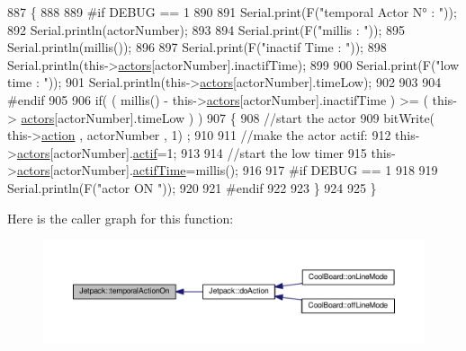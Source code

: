 \begin{DoxyCode}
887 \{
888 
889 \textcolor{preprocessor}{#if DEBUG == 1}
890     
891     Serial.print(F(\textcolor{stringliteral}{"temporal Actor N° : "}));
892     Serial.println(actorNumber);
893 
894     Serial.print(F(\textcolor{stringliteral}{"millis : "}));
895     Serial.println(millis());
896 
897     Serial.print(F(\textcolor{stringliteral}{"inactif Time : "}));
898     Serial.println(this->\hyperlink{class_jetpack_a7e16d2f97837f9712a2e6de1c50d99db}{actors}[actorNumber].inactifTime);
899 
900     Serial.print(F(\textcolor{stringliteral}{"low time : "}));
901     Serial.println(this->\hyperlink{class_jetpack_a7e16d2f97837f9712a2e6de1c50d99db}{actors}[actorNumber].timeLow);
902 
903 
904 \textcolor{preprocessor}{#endif}
905     
906      \textcolor{keywordflow}{if}( ( millis() - this->\hyperlink{class_jetpack_a7e16d2f97837f9712a2e6de1c50d99db}{actors}[actorNumber].inactifTime ) >= (  this->
      \hyperlink{class_jetpack_a7e16d2f97837f9712a2e6de1c50d99db}{actors}[actorNumber].timeLow  ) )
907     \{
908         \textcolor{comment}{//start the actor}
909         bitWrite( this->\hyperlink{class_jetpack_aca3142925a7b0834b34ae91d26af7765}{action} , actorNumber , 1) ;
910 
911         \textcolor{comment}{//make the actor actif:}
912         this->\hyperlink{class_jetpack_a7e16d2f97837f9712a2e6de1c50d99db}{actors}[actorNumber].\hyperlink{struct_jetpack_1_1state_aa177541689bbaea21a4650a083b0df77}{actif}=1;
913 
914         \textcolor{comment}{//start the low timer}
915         this->\hyperlink{class_jetpack_a7e16d2f97837f9712a2e6de1c50d99db}{actors}[actorNumber].\hyperlink{struct_jetpack_1_1state_af2e1cc323ef9ffcc3cf4d203f85d726b}{actifTime}=millis();
916 
917 \textcolor{preprocessor}{    #if DEBUG == 1 }
918 
919         Serial.println(F(\textcolor{stringliteral}{"actor ON "}));
920 
921 \textcolor{preprocessor}{    #endif              }
922 
923     \}
924 
925 \}
\end{DoxyCode}
Here is the caller graph for this function\+:\nopagebreak
\begin{figure}[H]
\begin{center}
\leavevmode
\includegraphics[width=350pt]{df/d1d/class_jetpack_ad011d904f639accb5f94ef806846ef59_icgraph}
\end{center}
\end{figure}
\mbox{\label{class_jetpack_a338f1af8cbc6504ac69b47c7328569b5}} 
